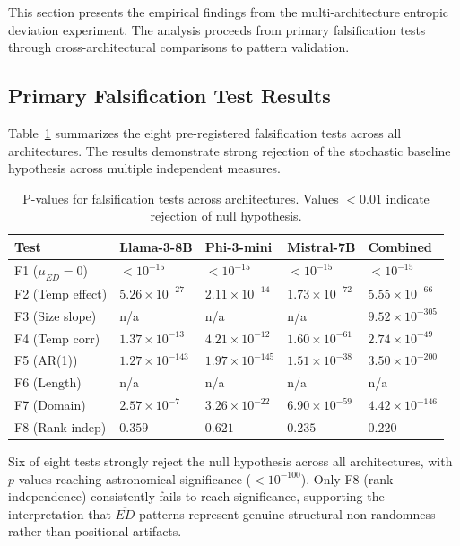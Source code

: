 \documentclass[12pt]{article}
\begin{document}
This section presents the empirical findings from the multi-architecture entropic deviation experiment. The analysis proceeds from primary falsification tests through cross-architectural comparisons to pattern validation.

\subsection{Primary Falsification Test Results}

Table~\ref{tab:primary_results} summarizes the eight pre-registered falsification tests across all architectures. The results demonstrate strong rejection of the stochastic baseline hypothesis across multiple independent measures.

\begin{table}[H]
\centering
\small
\begin{tabular}{lllll}
\toprule
Test & Llama-3-8B & Phi-3-mini & Mistral-7B & Combined \\
\midrule
F1 ($\mu_{ED}=0$) & $< 10^{-15}$ & $< 10^{-15}$ & $< 10^{-15}$ & $< 10^{-15}$ \\
F2 (Temp effect) & $5.26 \times 10^{-27}$ & $2.11 \times 10^{-14}$ & $1.73 \times 10^{-72}$ & $5.55 \times 10^{-66}$ \\
F3 (Size slope) & n/a & n/a & n/a & $9.52 \times 10^{-305}$ \\
F4 (Temp corr) & $1.37 \times 10^{-13}$ & $4.21 \times 10^{-12}$ & $1.60 \times 10^{-61}$ & $2.74 \times 10^{-49}$ \\
F5 (AR(1)) & $1.27 \times 10^{-143}$ & $1.97 \times 10^{-145}$ & $1.51 \times 10^{-38}$ & $3.50 \times 10^{-200}$ \\
F6 (Length) & n/a & n/a & n/a & n/a \\
F7 (Domain) & $2.57 \times 10^{-7}$ & $3.26 \times 10^{-22}$ & $6.90 \times 10^{-59}$ & $4.42 \times 10^{-146}$ \\
F8 (Rank indep) & $0.359$ & $0.621$ & $0.235$ & $0.220$ \\
\bottomrule
\end{tabular}
\caption{P-values for falsification tests across architectures. Values $< 0.01$ indicate rejection of null hypothesis.}
\label{tab:primary_results}
\end{table}

Six of eight tests strongly reject the null hypothesis across all architectures, with $p$-values reaching astronomical significance ($< 10^{-100}$). Only F8 (rank independence) consistently fails to reach significance, supporting the interpretation that $\overline{ED}$ patterns represent genuine structural non-randomness rather than positional artifacts.
\end{document}

